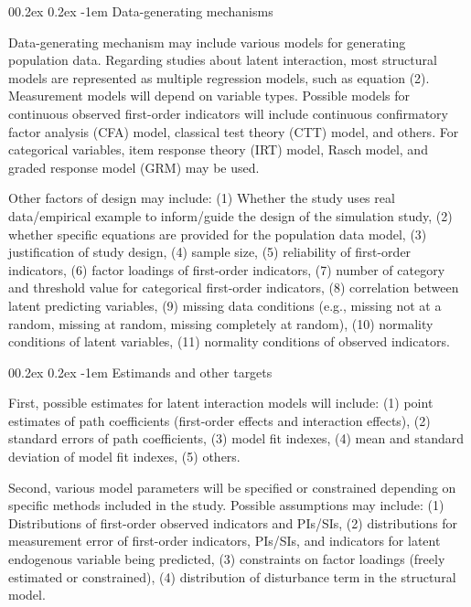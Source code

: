 \documentclass[
  man]{apa7}
\makeatletter
\let\oldparagraph\paragraph
\renewcommand{\paragraph}[1]{\oldparagraph{#1}\mbox{}}
\renewcommand{\paragraph}{\@startsection{paragraph}{4}{\parindent}%
  {0\baselineskip \@plus 0.2ex \@minus 0.2ex}%
  {-1em}%
  {\normalfont\normalsize\bfseries\itshape\typesectitle}}
\renewcommand{\paragraph}{\@startsection{paragraph}{4}{\parindent}%
  {0\baselineskip \@plus 0.2ex \@minus 0.2ex}%
  {-1em}%
  {\normalfont\normalsize\bfseries\typesectitle}}
\makeatother
\begin{document}
\hypertarget{data-generating-mechanisms}{%
\paragraph{Data-generating mechanisms}\label{data-generating-mechanisms}}

Data-generating mechanism may include various models for generating population data. Regarding studies about latent interaction, most structural models are represented as multiple regression models, such as equation (2). Measurement models will depend on variable types. Possible models for continuous observed first-order indicators will include continuous confirmatory factor analysis (CFA) model, classical test theory (CTT) model, and others. For categorical variables, item response theory (IRT) model, Rasch model, and graded response model (GRM) may be used.

Other factors of design may include: (1) Whether the study uses real data/empirical example to inform/guide the design of the simulation study, (2) whether specific equations are provided for the population data model, (3) justification of study design, (4) sample size, (5) reliability of first-order indicators, (6) factor loadings of first-order indicators, (7) number of category and threshold value for categorical first-order indicators, (8) correlation between latent predicting variables, (9) missing data conditions (e.g., missing not at a random, missing at random, missing completely at random), (10) normality conditions of latent variables, (11) normality conditions of observed indicators.

\hypertarget{estimands-and-other-targets}{%
\paragraph{Estimands and other targets}\label{estimands-and-other-targets}}

First, possible estimates for latent interaction models will include: (1) point estimates of path coefficients (first-order effects and interaction effects), (2) standard errors of path coefficients, (3) model fit indexes, (4) mean and standard deviation of model fit indexes, (5) others.

Second, various model parameters will be specified or constrained depending on specific methods included in the study. Possible assumptions may include: (1) Distributions of first-order observed indicators and PIs/SIs, (2) distributions for measurement error of first-order indicators, PIs/SIs, and indicators for latent endogenous variable being predicted, (3) constraints on factor loadings (freely estimated or constrained), (4) distribution of disturbance term in the structural model.
\end{document}
